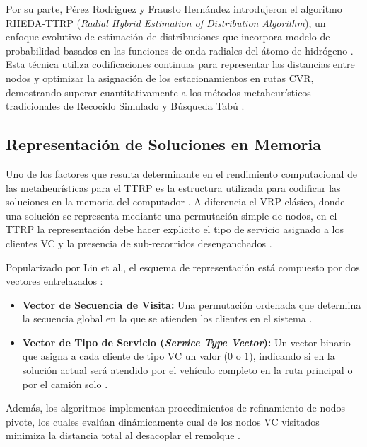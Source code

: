 \documentclass[letter, 10pt]{article}
\begin{document}
\vspace{0.3cm}

Por su parte, P\'erez Rodriguez y Frausto Hern\'andez \cite{perez2023radial} introdujeron el algoritmo RHEDA-TTRP (\textit{Radial Hybrid Estimation of Distribution Algorithm}), un enfoque evolutivo de estimaci\'on de distribuciones que incorpora modelo de probabilidad basados en las funciones de onda radiales del \'atomo de hidr\'ogeno \cite{perez2023radial}.
Esta t\'ecnica utiliza codificaciones continuas para representar las distancias entre nodos y optimizar la asignaci\'on de los estacionamientos en rutas CVR, demostrando superar cuantitativamente a los m\'etodos metaheur\'isticos tradicionales de Recocido Simulado y B\'usqueda Tab\'u \cite{perez2023radial}.

\subsection{Representaci\'on de Soluciones en Memoria}
Uno de los factores que resulta determinante en el rendimiento computacional de las metaheur\'isticas para el TTRP es la estructura utilizada para codificar las soluciones en la memoria del computador \cite{lin2009solving}.
A diferencia el VRP cl\'asico, donde una soluci\'on se representa mediante una permutaci\'on simple de nodos, en el TTRP la representaci\'on debe hacer explicito el tipo de servicio asignado a los clientes VC y la presencia de sub-recorridos desenganchados \cite{chao2002tabu,lin2009solving}.

\vspace{0.3cm}

Popularizado por Lin et al., el esquema de representaci\'on est\'a compuesto por dos vectores entrelazados \cite{lin2009solving}:
\begin{itemize}
    \item \textbf{Vector de Secuencia de Visita:} Una permutaci\'on ordenada que determina la secuencia global en la que se atienden los clientes en el sistema \cite{lin2009solving}.
    \item \textbf{Vector de Tipo de Servicio (\textit{Service Type Vector}):} Un vector binario que asigna a cada cliente de tipo VC un valor ($0$ o $1$), indicando si en la soluci\'on actual ser\'a atendido por el veh\'iculo completo en la ruta principal o por el cami\'on solo \cite{lin2009solving}.
\end{itemize}

Adem\'as, los algoritmos implementan procedimientos de refinamiento de nodos pivote, los cuales eval\'uan din\'amicamente cual de los nodos VC visitados minimiza la distancia total al desacoplar el remolque \cite{lin2009solving}.
\end{document}
